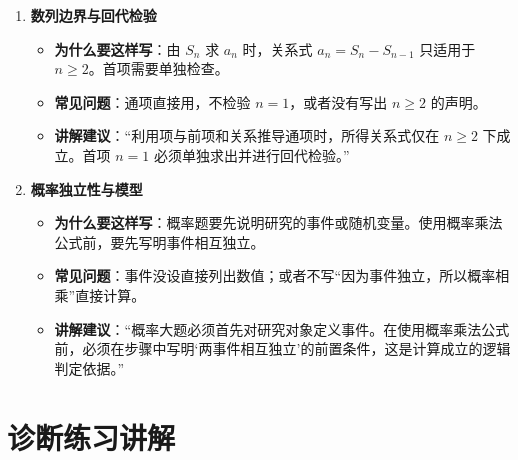 \documentclass[11pt,a4paper]{ctexart}
\newcommand{\topicteacherproblem}[2]{%
  \teachquestionheader{#1\quad #2}
}
\begin{document}
{\begin{enumerate}[label=\arabic*. , leftmargin=2em, itemsep=0.3em]
      \begin{itemize}[leftmargin=1.5em, itemsep=0.1em]
        \item \textbf{为什么要这样写}：解析几何的中间步骤较多，设点设线、联立、判别式、韦达、代入目标式都可能给分。
        \item \textbf{常见问题}：忽视斜率不存在的情形；在韦达定理前不写判别式 \(\Delta > 0\)。
        \item \textbf{讲解建议}：“解析几何的步骤分比较集中。把‘设点设线、联立消元、判别式与韦达定理’写完整，能减少因过程缺失造成的失分。”
      \end{itemize}
    \item \textbf{数列边界与回代检验}
      \begin{itemize}[leftmargin=1.5em, itemsep=0.1em]
        \item \textbf{为什么要这样写}：由 \(S_n\) 求 \(a_n\) 时，关系式 \(a_n = S_n - S_{n-1}\) 只适用于 \(n \ge 2\)。首项需要单独检查。
        \item \textbf{常见问题}：通项直接用，不检验 \(n=1\)，或者没有写出 \(n \ge 2\) 的声明。
        \item \textbf{讲解建议}：“利用项与前项和关系推导通项时，所得关系式仅在 \(n \ge 2\) 下成立。首项 \(n=1\) 必须单独求出并进行回代检验。”
      \end{itemize}
    \item \textbf{概率独立性与模型}
      \begin{itemize}[leftmargin=1.5em, itemsep=0.1em]
        \item \textbf{为什么要这样写}：概率题要先说明研究的事件或随机变量。使用概率乘法公式前，要先写明事件相互独立。
        \item \textbf{常见问题}：事件没设直接列出数值；或者不写“因为事件独立，所以概率相乘”直接计算。
        \item \textbf{讲解建议}：“概率大题必须首先对研究对象定义事件。在使用概率乘法公式前，必须在步骤中写明‘两事件相互独立’的前置条件，这是计算成立的逻辑判定依据。”
      \end{itemize}
  \end{enumerate}
}

\newpage

\section{诊断练习讲解}

\topicteacherproblem{检测 1}{代数分类讨论与退化边界}
{\small \qGeneralCheckOneStem}

\begin{paracol}{2}

\switchcolumn
{}
\end{paracol}
\end{document}
